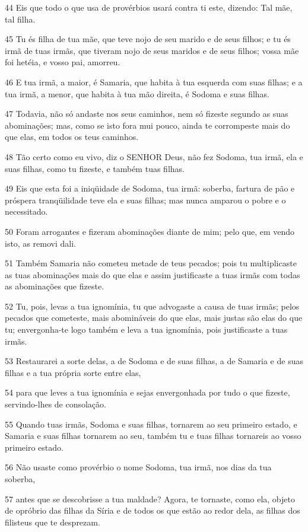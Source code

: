\par 44 Eis que todo o que usa de provérbios usará contra ti este, dizendo: Tal mãe, tal filha.
\par 45 Tu és filha de tua mãe, que teve nojo de seu marido e de seus filhos; e tu és irmã de tuas irmãs, que tiveram nojo de seus maridos e de seus filhos; vossa mãe foi hetéia, e vosso pai, amorreu.
\par 46 E tua irmã, a maior, é Samaria, que habita à tua esquerda com suas filhas; e a tua irmã, a menor, que habita à tua mão direita, é Sodoma e suas filhas.
\par 47 Todavia, não só andaste nos seus caminhos, nem só fizeste segundo as suas abominações; mas, como se isto fora mui pouco, ainda te corrompeste mais do que elas, em todos os teus caminhos.
\par 48 Tão certo como eu vivo, diz o SENHOR Deus, não fez Sodoma, tua irmã, ela e suas filhas, como tu fizeste, e também tuas filhas.
\par 49 Eis que esta foi a iniqüidade de Sodoma, tua irmã: soberba, fartura de pão e próspera tranqüilidade teve ela e suas filhas; mas nunca amparou o pobre e o necessitado.
\par 50 Foram arrogantes e fizeram abominações diante de mim; pelo que, em vendo isto, as removi dali.
\par 51 Também Samaria não cometeu metade de teus pecados; pois tu multiplicaste as tuas abominações mais do que elas e assim justificaste a tuas irmãs com todas as abominações que fizeste.
\par 52 Tu, pois, levas a tua ignomínia, tu que advogaste a causa de tuas irmãs; pelos pecados que cometeste, mais abomináveis do que elas, mais justas são elas do que tu; envergonha-te logo também e leva a tua ignomínia, pois justificaste a tuas irmãs.
\par 53 Restaurarei a sorte delas, a de Sodoma e de suas filhas, a de Samaria e de suas filhas e a tua própria sorte entre elas,
\par 54 para que leves a tua ignomínia e sejas envergonhada por tudo o que fizeste, servindo-lhes de consolação.
\par 55 Quando tuas irmãs, Sodoma e suas filhas, tornarem ao seu primeiro estado, e Samaria e suas filhas tornarem ao seu, também tu e tuas filhas tornareis ao vosso primeiro estado.
\par 56 Não usaste como provérbio o nome Sodoma, tua irmã, nos dias da tua soberba,
\par 57 antes que se descobrisse a tua maldade? Agora, te tornaste, como ela, objeto de opróbrio das filhas da Síria e de todos os que estão ao redor dela, as filhas dos filisteus que te desprezam.
